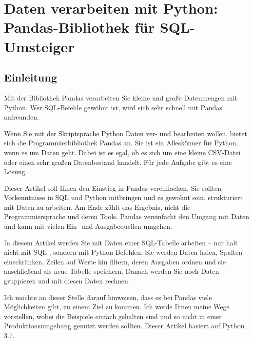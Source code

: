 %
%
%
%




\chapter{Daten verarbeiten mit Python: Pandas-Bibliothek für SQL-Umsteiger}

\section{Einleitung}


Mit der Bibliothek Pandas verarbeiten Sie kleine und große Datenmengen mit Python. Wer SQL-Befehle gewöhnt ist, wird sich sehr schnell mit Pandas anfreunden.

Wenn Sie mit der Skriptsprache Python Daten ver- und bearbeiten wollen, bietet sich die Programmierbibliothek Pandas an. Sie ist ein Alleskönner für Python, wenn es um Daten geht. Dabei ist es egal, ob es sich um eine kleine CSV-Datei oder einen sehr großen Datenbestand handelt. Für jede Aufgabe gibt es eine Lösung.

Dieser Artikel soll Ihnen den Einstieg in Pandas vereinfachen. Sie sollten Vorkenntnisse in SQL und Python mitbringen und es gewohnt sein, strukturiert mit Daten zu arbeiten. Am Ende zählt das Ergebnis, nicht die Programmiersprache und deren Tools. Pandas vereinfacht den Umgang mit Daten und kann mit vielen Ein- und Ausgabequellen umgehen.

In diesem Artikel werden Sie mit Daten einer SQL-Tabelle arbeiten – nur halt nicht mit SQL-, sondern mit Python-Befehlen. Sie werden Daten laden, Spalten einschränken, Zeilen auf Werte hin filtern, deren Ausgaben ordnen und sie anschließend als neue Tabelle speichern. Danach werden Sie noch Daten gruppieren und mit diesen Daten rechnen.

Ich möchte an dieser Stelle darauf hinweisen, dass es bei Pandas viele Möglichkeiten gibt, zu einem Ziel zu kommen. Ich werde Ihnen meine Wege vorstellen, wobei die Beispiele einfach gehalten sind und so nicht in einer Produktionsumgebung genutzt werden sollten. Dieser Artikel basiert auf Python 3.7.

